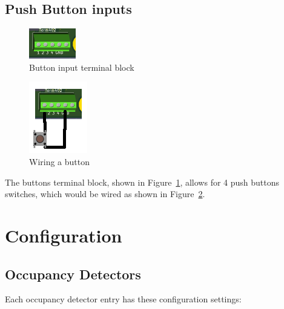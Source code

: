 \subsection{Push Button inputs}
\begin{figure}[hbpt]\begin{centering}%
\includegraphics{ESP32-S3-MultiFunction-ButtonsTerminalBlock.png}
\caption{Button input terminal block}
\label{fig:ESP32-S3-MultiFunction-ButtonsTerminalBlock}
\end{centering}\end{figure}
\begin{figure}[hbpt]\begin{centering}%
\includegraphics{ESP32-S3-MultiFunctionButtonWiring.png}
\caption{Wiring a button}
\label{fig:ESP32-S3-MultiFunctionButtonWiring}
\end{centering}\end{figure}

The buttons terminal block, shown in 
Figure~\ref{fig:ESP32-S3-MultiFunction-ButtonsTerminalBlock}, allows for 4 
push buttons switches, which would be wired as shown in 
Figure~\ref{fig:ESP32-S3-MultiFunctionButtonWiring}.

\clearpage
\section{Configuration}

\subsection{Occupancy Detectors}

Each occupancy detector entry has these configuration settings:

